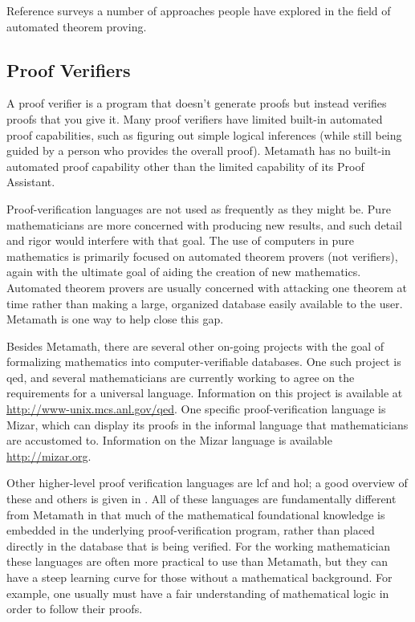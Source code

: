 Reference \cite{Bledsoe} surveys a number of approaches
people have explored in the field of automated theorem proving.


\subsection{Proof Verifiers}\label{proofverifiers}

A proof verifier is a program that doesn't generate proofs but instead
verifies proofs that you give it.  Many proof verifiers have limited built-in
automated proof capabilities, such as figuring out simple logical inferences
(while still being guided by a person who provides the overall proof).  Metamath
has no built-in automated proof capability other than the limited
capability of its Proof Assistant.

Proof-verification languages are not used as frequently as they might be.
Pure mathematicians are more concerned with producing new results, and such
detail and rigor would interfere with that goal.  The use of computers in pure
mathematics is primarily focused on automated theorem provers (not verifiers),
again with the ultimate goal of aiding the creation of new mathematics.
Automated theorem provers are usually concerned with attacking one theorem at
time rather than making a large, organized database easily available to the
user.  Metamath is one way to help close this gap.

Besides Metamath, there are several other on-going projects with the goal of
formalizing mathematics into computer-verifiable databases. One such project
is {\sc qed}, and several mathematicians
are currently working to agree on the requirements for a universal language.
Information on this project is available
at \url{http://www-unix.mcs.anl.gov/qed}.  One
specific proof-verification language is Mizar, which can display
its proofs in the informal language that mathematicians are accustomed to.
Information on the Mizar language is available \url{http://mizar.org}.

Other higher-level proof verification languages are {\sc lcf} and {\sc hol}; a good overview of these and others
is given in \cite{Harrison}.  All of these languages are fundamentally
different from Metamath in that much of the mathematical foundational
knowledge is embedded in the underlying proof-verification program, rather
than placed directly in the database that is being verified.  For the working
mathematician these languages are often more practical to use than Metamath,
but they can have a steep learning curve for those without a mathematical
background.  For example, one usually must have a fair understanding of
mathematical logic in order to follow their proofs.

